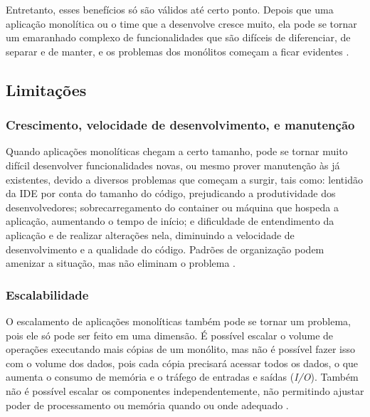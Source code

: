 Entretanto, esses benefícios só são válidos até certo ponto. Depois que uma aplicação monolítica ou o time que a desenvolve cresce muito, ela pode se tornar um emaranhado complexo de funcionalidades que são difíceis de diferenciar, de separar e de manter, e os problemas dos monólitos começam a ficar evidentes \cite{microservicesIO_monolithic_architecture}.

\subsection{Limitações}\label{subsection-monolitos-limitacoes}

\subsubsection{Crescimento, velocidade de desenvolvimento, e manutenção}
Quando aplicações monolíticas chegam a certo tamanho, pode se tornar muito difícil desenvolver funcionalidades novas, ou mesmo prover manutenção às já existentes, devido a diversos problemas que começam a surgir, tais como: lentidão da IDE por conta do tamanho do código, prejudicando a produtividade dos desenvolvedores; sobrecarregamento do container ou máquina que hospeda a aplicação, aumentando o tempo de início; e dificuldade de entendimento da aplicação e de realizar alterações nela, diminuindo a velocidade de desenvolvimento e a qualidade do código. Padrões de organização podem amenizar a situação, mas não eliminam o problema \cite{microservicesIO_monolithic_architecture}.

\subsubsection{Escalabilidade}
O escalamento de aplicações monolíticas também pode se tornar um problema, pois ele só pode ser feito em uma dimensão. É possível escalar o volume de operações executando mais cópias de um monólito, mas não é possível fazer isso com o volume dos dados, pois cada cópia precisará acessar todos os dados, o que aumenta o consumo de memória e o tráfego de entradas e saídas (\emph{I/O}). Também não é possível escalar os componentes independentemente, não permitindo ajustar poder de processamento ou memória quando ou onde adequado \cite{microservicesIO_monolithic_architecture}.


